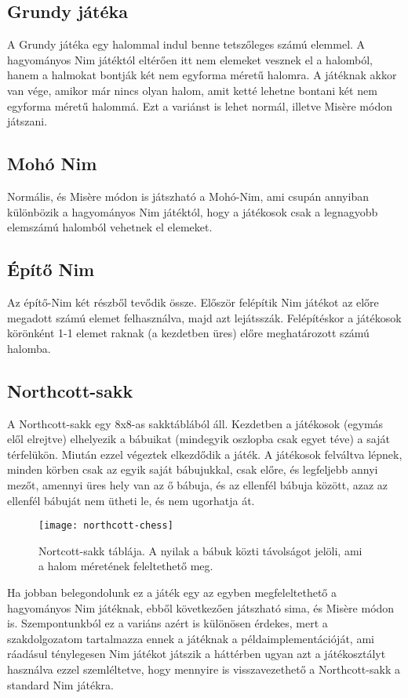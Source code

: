 \subsection{Grundy játéka}
A Grundy játéka egy halommal indul benne tetszőleges számú elemmel. A hagyományos Nim játéktól eltérően itt nem elemeket vesznek el a halomból, hanem a halmokat bontják két nem egyforma méretű halomra. A játéknak akkor van vége, amikor már nincs olyan halom, amit ketté lehetne bontani két nem egyforma méretű halommá. Ezt a variánst is lehet normál, illetve Misère módon játszani.

\subsection{Mohó Nim}
Normális, és Misère módon is játszható a Mohó-Nim, ami csupán annyiban különbözik a hagyományos Nim játéktól, hogy a játékosok csak a legnagyobb elemszámú halomból vehetnek el elemeket.

\subsection{Építő Nim}
Az építő-Nim két részből tevődik össze. Először felépítik Nim játékot az előre megadott számú elemet felhasználva, majd azt lejátsszák. Felépítéskor a játékosok körönként 1-1 elemet raknak (a kezdetben üres) előre meghatározott számú halomba.

\subsection{Northcott-sakk}
A Northcott-sakk egy 8x8-as sakktáblából áll. Kezdetben a játékosok (egymás elől elrejtve) elhelyezik a bábuikat (mindegyik oszlopba csak egyet téve) a saját térfelükön. Miután ezzel végeztek elkezdődik a játék. A játékosok felváltva lépnek, minden körben csak az egyik saját bábujukkal, csak előre, és legfeljebb annyi mezőt, amennyi üres hely van az ő bábuja, és az ellenfél bábuja között, azaz az ellenfél bábuját nem ütheti le, és nem ugorhatja át.\ujsor

\begin{figure}[h]
	\texttt{[image: northcott-chess]}
	\centering
	\caption{Nortcott-sakk táblája. A nyilak a bábuk közti távolságot jelöli, ami a halom méretének feleltethető meg.}
\end{figure}

Ha jobban belegondolunk ez a játék egy az egyben megfeleltethető a hagyományos Nim játéknak, ebből következően játszható sima, és Misère módon is.\ujsor 
Szempontunkból ez a variáns azért is különösen érdekes, mert a szakdolgozatom tartalmazza ennek a játéknak a példaimplementációját, ami ráadásul ténylegesen Nim játékot játszik a háttérben ugyan azt a játékosztályt használva ezzel szemléltetve, hogy mennyire is visszavezethető a Northcott-sakk a standard Nim játékra.

